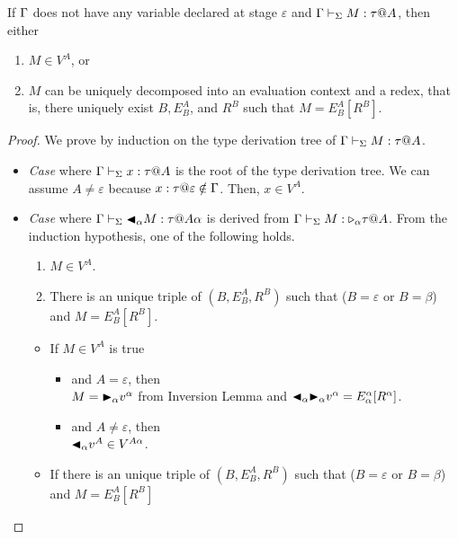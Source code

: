 \begin{lemma}
  If $\Gamma$ does not have any variable declared at stage $\varepsilon$ 
  and $\Gamma \vdash_\Sigma M : \tau @ A$, then either
  \begin{enumerate}
  \item $ M \in V^A$, or
  \item $M$ can be uniquely decomposed into an evaluation context and a redex, that is, there uniquely exist $B, E^A_B$, and $R^B$ such that $M = E^A_B[R^B]$.
  \end{enumerate}
\end{lemma}

\begin{proof}
	We prove by induction on the type derivation tree of $\G \V M:\tau@A$.
			
	\begin{itemize}
		\item \textit{Case} \TVar
		      where \(\G\V x:\tau@A\) is the root of the type derivation tree.
		      We can assume $A \neq \varepsilon$ because $x:\tau@\varepsilon \notin \G$.
		      Then, $x \in V^A$.
		\item \textit{Case} \TTBL{}
		      where \(\Gamma \vdash_\Sigma {\mathop{\blacktriangleleft}}_\alpha M :\tau @ A\alpha\) is derived from \(\Gamma \vdash_\Sigma M : {\mathop{\triangleright}}_\alpha \tau @ A\).
		      From the induction hypothesis, one of the following holds.
		      \begin{enumerate}
		      	\item $ M \in V^A$.
		      	\item There is an unique triple of $(B, E^A_B, R^B)$ such that ($B = \varepsilon$ or $B = \beta$) and $M = E^A_B[R^B]$.
		      \end{enumerate}
		      \begin{itemize}
		      	\item If $ M \in V^A$ is true
					\begin{itemize}
						\item and $A=\varepsilon$, then\\
							$ M = {\mathop{\blacktriangleright}}_\alpha v^\alpha $ from Inversion Lemma and
		      	      		${\mathop{\blacktriangleleft}}_\alpha {\mathop{\blacktriangleright}}_\alpha v^\alpha = E^\alpha_\alpha [R^\alpha]$.
						\item and $A\neq\varepsilon$, then\\
							${\mathop{\blacktriangleleft}}_\alpha v^A \in V^{A\alpha}$.
					\end{itemize}
		      	\item If there is an unique triple of $(B, E^A_B, R^B)$ such that ($B = \varepsilon$ or $B = \beta$) and $M = E^A_B[R^B]$

\end{itemize}
\end{itemize}
\end{proof}
